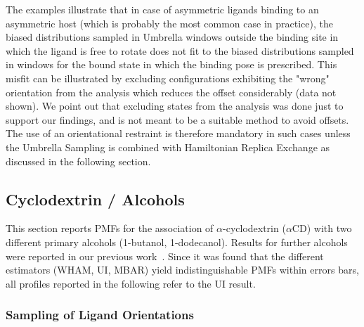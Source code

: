 \documentclass[9pt,lessons]{livecoms}
\begin{document}
The examples illustrate that in case of asymmetric ligands binding to an asymmetric host (which is probably the most common case in practice), 
the biased distributions sampled in Umbrella windows outside the binding site in which the ligand is free to rotate does not fit to the biased distributions sampled in windows for the bound state 
in which the binding pose is prescribed. This misfit can be illustrated by excluding configurations exhibiting the "wrong" orientation from the analysis which reduces the offset considerably (data not shown). 
We point out that excluding states from the analysis was done just to support our findings, and is not meant to be a suitable method to avoid offsets. 
The use of an orientational restraint is therefore mandatory in such cases unless the Umbrella Sampling is combined with Hamiltonian Replica Exchange as discussed in the following section.

\subsection{Cyclodextrin / Alcohols}
\label{sec:application}

This section reports PMFs for the association of $\alpha$-cyclodextrin ($\alpha$CD) with two different primary alcohols (1-butanol, 1-dodecanol).
Results for further alcohols were reported in our previous work~\cite{markthaler2017molecular}.
Since it was found that the different estimators (WHAM, UI, MBAR) yield indistinguishable PMFs within errors bars, all profiles reported in the following refer to the UI result.

\subsubsection*{Sampling of Ligand Orientations}
\end{document}
